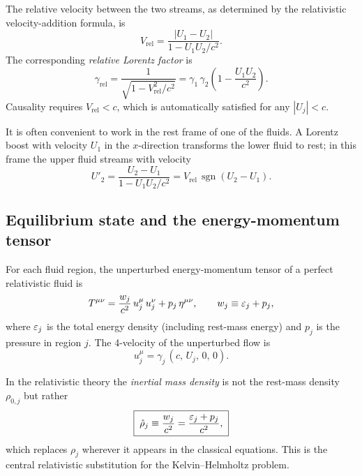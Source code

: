 The relative velocity between the two streams, as determined by
the relativistic velocity-addition formula, is
\begin{equation}\label{eq:rel-11-2}
  \boxed{\;
  V_{\mathrm{rel}} = \frac{|U_1 - U_2|}{1 - U_1 U_2/c^{2}}.
  \;}
\end{equation}
The corresponding \emph{relative Lorentz factor} is
\begin{equation}\label{eq:rel-11-3}
  \gamma_{\mathrm{rel}}
  = \frac{1}{\sqrt{1 - V_{\mathrm{rel}}^{2}/c^{2}}}
  = \gamma_1\,\gamma_2\!\left(1 - \frac{U_1 U_2}{c^{2}}\right).
\end{equation}
Causality requires $V_{\mathrm{rel}} < c$, which is automatically
satisfied for any $|U_j| < c$.

It is often convenient to work in the rest frame of one of the fluids.
A Lorentz boost with velocity $U_1$ in the $x$-direction transforms
the lower fluid to rest; in this frame the upper fluid streams with
velocity
\begin{equation}\label{eq:rel-11-4}
  U'_{2} = \frac{U_2 - U_1}{1 - U_1 U_2/c^{2}} = V_{\mathrm{rel}}\,
  \operatorname{sgn}(U_2 - U_1).
\end{equation}

\subsection{Equilibrium state and the energy-momentum tensor}

For each fluid region, the unperturbed energy-momentum tensor of a
perfect relativistic fluid is
\begin{equation}\label{eq:rel-11-5}
  T^{\mu\nu} = \frac{w_j}{c^{2}}\, u_j^{\mu}\, u_j^{\nu}
  + p_j\, \eta^{\mu\nu},
  \qquad w_j \equiv \varepsilon_j + p_j,
\end{equation}
where $\varepsilon_j$ is the total energy density (including rest-mass
energy) and $p_j$ is the pressure in region $j$.  The 4-velocity of
the unperturbed flow is
\begin{equation}\label{eq:rel-11-6}
  u_j^{\mu} = \gamma_j\,(c,\, U_j,\, 0,\, 0).
\end{equation}

In the relativistic theory the \emph{inertial mass density} is not the
rest-mass density $\rho_{0,j}$ but rather
\begin{equation}\label{eq:rel-11-7}
  \boxed{\;
  \hat{\rho}_j \equiv \frac{w_j}{c^{2}}
  = \frac{\varepsilon_j + p_j}{c^{2}},
  \;}
\end{equation}
which replaces $\rho_j$ wherever it appears in the classical equations.
This is the central relativistic substitution for the Kelvin--Helmholtz
problem.

